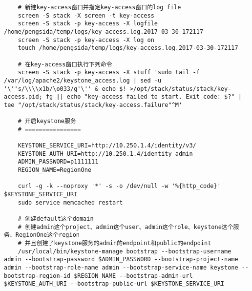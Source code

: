 \documentclass[a4paper,left=1.5cm,right=1.5cm,11pt]{article}
\begin{document}
\begin{lstlisting}
	# 新建key-access窗口并指定key-access窗口的log file
	screen -S stack -X screen -t key-access
	screen -S stack -p key-access -X logfile /home/pengsida/temp/logs/key-access.log.2017-03-30-172117
	screen -S stack -p key-access -X log on
	touch /home/pengsida/temp/logs/key-access.log.2017-03-30-172117

	# 在key-access窗口执行下列命令
	screen -S stack -p key-access -X stuff 'sudo tail -f /var/log/apache2/keystone_access.log | sed -u '\''s/\\\\x1b/\o033/g'\'' & echo $! >/opt/stack/status/stack/key-access.pid; fg || echo "key-access failed to start. Exit code: $?" | tee "/opt/stack/status/stack/key-access.failure"^M'

	# 开启keystone服务
	# ================

	KEYSTONE_SERVICE_URI=http://10.250.1.4/identity/v3/
	KEYSTONE_AUTH_URI=http://10.250.1.4/identity_admin
	ADMIN_PASSWORD=p1111111
	REGION_NAME=RegionOne

	curl -g -k --noproxy '*' -s -o /dev/null -w '%{http_code}' $KEYSTONE_SERVICE_URI
	sudo service memcached restart
	
	# 创建default这个domain
	# 创建admin这个project、admin这个user、admin这个role、keystone这个服务、RegionOne这个region
	# 并且创建了keystone服务的admin的endpoint和public的endpoint
	/usr/local/bin/keystone-manage bootstrap --bootstrap-username admin --bootstrap-password $ADMIN_PASSWORD --bootstrap-project-name admin --bootstrap-role-name admin --bootstrap-service-name keystone --bootstrap-region-id $REGION_NAME --bootstrap-admin-url $KEYSTONE_AUTH_URI --bootstrap-public-url $KEYSTONE_SERVICE_URI
	\end{lstlisting}
\end{document}
